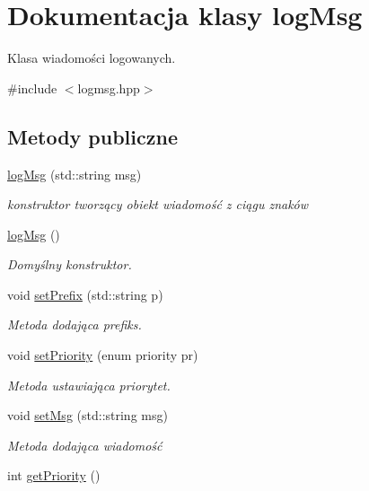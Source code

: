 \hypertarget{classlog_msg}{}\section{Dokumentacja klasy log\+Msg}
\label{classlog_msg}


Klasa wiadomości logowanych.  




{\ttfamily \#include $<$logmsg.\+hpp$>$}

\subsection*{Metody publiczne}
\begin{DoxyCompactItemize}
\item 
\hyperlink{classlog_msg_a59a223eea638eb82439786fa0b21ae99}{log\+Msg} (std\+::string msg)
\begin{DoxyCompactList}\small\item\em konstruktor tworzący obiekt wiadomość z ciągu znaków \end{DoxyCompactList}\item 
\hyperlink{classlog_msg_a7a9c2ceecce658a2d89c17e54f50627e}{log\+Msg} ()
\begin{DoxyCompactList}\small\item\em Domyślny konstruktor. \end{DoxyCompactList}\item 
void \hyperlink{classlog_msg_a11cdf7b82dc82b369a5d62b721b27e46}{set\+Prefix} (std\+::string p)
\begin{DoxyCompactList}\small\item\em Metoda dodająca prefiks. \end{DoxyCompactList}\item 
void \hyperlink{classlog_msg_a5877fcab52fdf21e293997e32219724f}{set\+Priority} (enum priority pr)
\begin{DoxyCompactList}\small\item\em Metoda ustawiająca priorytet. \end{DoxyCompactList}\item 
void \hyperlink{classlog_msg_a329a01a7f2b71cd3adbc0aa637169a65}{set\+Msg} (std\+::string msg)
\begin{DoxyCompactList}\small\item\em Metoda dodająca wiadomość \end{DoxyCompactList}\item 
int \hyperlink{classlog_msg_a631e3b2a26f15c3b39b0718bcf3c3a57}{get\+Priority} ()

\end{DoxyCompactItemize}
